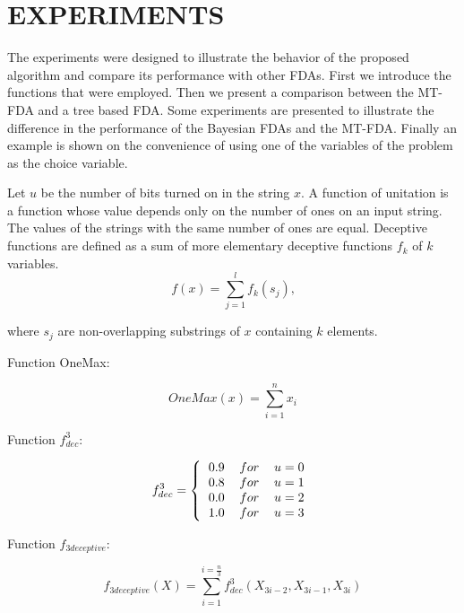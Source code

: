 \documentclass[10pt,thmsa]{article}
\begin{document}
\section{EXPERIMENTS}

\medskip The experiments were designed to illustrate the behavior of the
proposed algorithm and compare its performance with other FDAs. First we
introduce the functions that were employed. Then we present a comparison
between the MT-FDA and a tree based FDA. Some experiments are presented to
illustrate the difference in the performance of the Bayesian FDAs and the
MT-FDA. Finally an example is shown on the convenience of using one of the
variables of the problem as the choice variable.

Let $u$ be the number of bits turned on in the string $x$. A function of
unitation is a function whose value depends only on the number of ones on an
input string. The values of the strings with the same number of ones are
equal. Deceptive functions are defined as a sum of more elementary deceptive
functions $f_k$ of $k$ variables.\medskip 
\begin{equation}
f(x)=\sum\limits_{j=1}^lf_k(s_j)\text{,}
\label{Deceptive additively decomposed function}
\end{equation}

\medskip

where $s_j$ are non-overlapping substrings of $x$ containing $k$ elements.

\medskip

Function OneMax:

\begin{equation}
OneMax(x)=\sum\limits_{i=1}^nx_i  \label{OneMax function}
\end{equation}

Function $f_{dec}^3$:

\begin{equation}
f_{dec}^3=\left\{ 
\begin{tabular}{ccc}
$0.9$ & $for$ & $u=0$ \\ 
$0.8$ & $for$ & $u=1$ \\ 
$0.0$ & $for$ & $u=2$ \\ 
$1.0$ & $for$ & $u=3$%
\end{tabular}
\right.  \label{Deceptive function of order 3}
\end{equation}

Function $f_{3deceptive}$:

\begin{equation}
f_{3deceptive}(X)=\sum\limits_{i=1}^{i=\frac
n3}f_{dec}^3(X_{3i-2},X_{3i-1},X_{3i})  \label{f3deceptive}
\end{equation}
\end{document}
